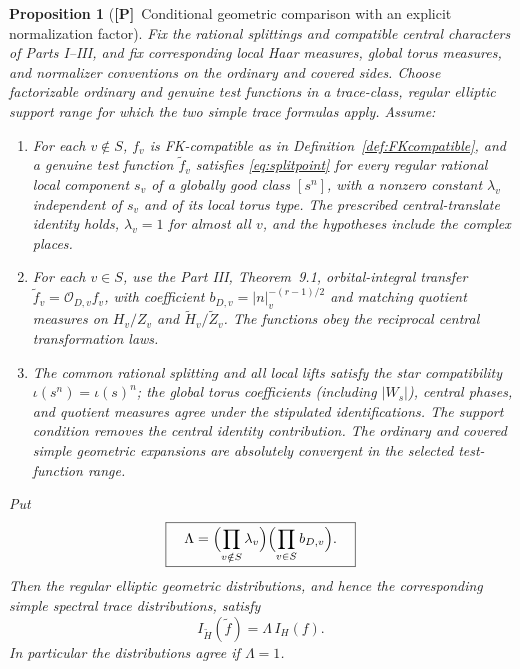 \documentclass[11pt]{article}
\newcommand{\Ptag}{\textnormal{\textbf{[P]}}}
\theoremstyle{plain}
\newtheorem{proposition}[theorem]{Proposition}
\theoremstyle{definition}
\begin{document}
\begin{proposition}[\Ptag\ Conditional geometric comparison with
an explicit normalization factor]\label{prop:conditionalglobal}
Fix the rational splittings and compatible central characters
of Parts I--III, and fix \emph{corresponding} local Haar measures,
global torus measures, and normalizer conventions on the ordinary
and covered sides.  Choose factorizable ordinary and genuine test
functions in a trace-class, regular elliptic support range for
which the two simple trace formulas apply. Assume:
\begin{enumerate}[label=(\roman*)]
\item For each $v\notin S$, $f_v$ is FK-compatible as in
Definition~\ref{def:FKcompatible}, and a genuine test function
$\widetilde f_v$ satisfies \eqref{eq:splitpoint} for every regular
rational local component $s_v$ of a globally good class $[s^n]$,
with a nonzero constant $\lambda_v$ independent of $s_v$ and of
its local torus type.  The prescribed central-translate identity
holds, $\lambda_v=1$ for almost all $v$, and the hypotheses include
the complex places.
\item For each $v\in S$, use the Part III, Theorem~9.1,
orbital-integral transfer $\widetilde f_v=\mathcal O_{D,v}f_v$,
with coefficient $b_{D,v}=|n|_v^{-(r-1)/2}$ and matching quotient
measures on $H_v/Z_v$ and $\widetilde H_v/\widetilde Z_v$.
The functions obey the reciprocal central transformation laws.
\item The common rational splitting and all local lifts satisfy
the star compatibility $\iota(s^n)=\iota(s)^n$; the global torus
coefficients (including $|W_s|$), central phases, and quotient
measures agree under the stipulated identifications.  The support
condition removes the central identity contribution.  The
ordinary and covered simple geometric expansions are absolutely
convergent in the selected test-function range.
\end{enumerate}
Put
\begin{equation}\label{eq:lambda-product}
 \boxed{\quad
 \Lambda=\Bigl(\prod_{v\notin S}\lambda_v\Bigr)
          \Bigl(\prod_{v\in S}b_{D,v}\Bigr).\quad}
\end{equation}
Then the regular elliptic geometric distributions, and hence the
corresponding simple spectral trace distributions, satisfy
\begin{equation}\label{eq:globalLambda}
 \boxed{\quad I_{\widetilde H}(\widetilde f)
              =\Lambda\,I_H(f).\quad}
\end{equation}
In particular the distributions agree if $\Lambda=1$.
\end{proposition}
\end{document}
